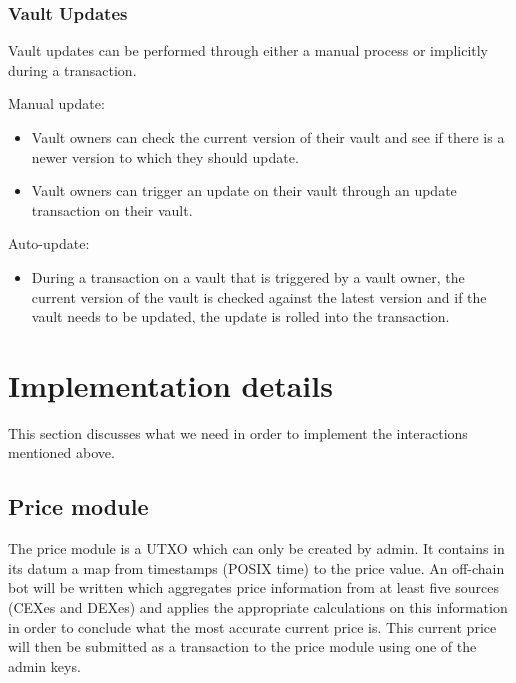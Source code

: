 \documentclass{article} %
\begin{document}

\subsubsection{Vault Updates}

Vault updates can be performed through either a manual process or implicitly
during a transaction. 
 
Manual update:

\begin{itemize}
  \item Vault owners can check the current version of their vault and see if
    there is a newer version to which they should update.
  \item Vault owners can trigger an update on their vault through an update
    transaction on their vault. 
\end{itemize} 
  
Auto-update:

\begin{itemize}
  \item During a transaction on a vault that is triggered by a vault owner, the
    current version of the vault is checked against the latest version and if the
    vault needs to be updated, the update is rolled into the transaction. 
\end{itemize} 
  
\section{Implementation details}

This section discusses what we need in order to implement the interactions
mentioned above.

\subsection{Price module}

The price module is a UTXO which can only be created by admin.
It contains in its datum a map from timestamps (POSIX time) to the price value.
An off-chain bot will be written which aggregates price information from at
least five sources (CEXes and DEXes) and applies the appropriate calculations on
this information in order to conclude what the most accurate current price is.
This current price will then be submitted as a transaction to the price module
using one of the admin keys.
\end{document}
